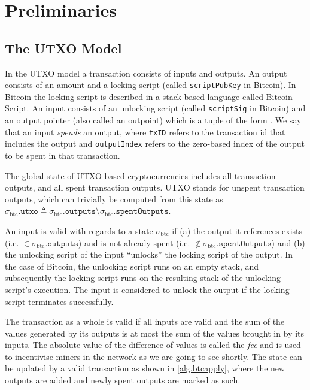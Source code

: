 \section{Preliminaries}
\subsection{The UTXO Model}
In the UTXO model a transaction consists of inputs and outputs. An output consists of an amount and a locking script (called \texttt{scriptPubKey} in Bitcoin). In Bitcoin the locking script is described in a stack-based language called Bitcoin Script. An input consists of an unlocking script (called \texttt{scriptSig} in Bitcoin) and an output pointer (also called an outpoint) which is a tuple of the form . We say that an input \emph{spends} an output, where \texttt{txID} refers to the transaction id that includes the output and \texttt{outputIndex} refers to the zero-based index of the output to be spent in that transaction.

\def\btcstate{\ensuremath{\sigma_\text{btc}}}
\def\btcapply{\text{apply}\textsubscript{btc}}
\def\outputs{\texttt{outputs}}
\def\inputs{\texttt{inputs}}
\def\spentOutputs{\texttt{spentOutputs}}
\def\utxo{\texttt{utxo}}
The global state of UTXO based cryptocurrencies includes all transaction outputs, and all spent transaction outputs. UTXO stands for unspent transaction outputs, which can trivially be computed from this state as $\btcstate.\utxo \triangleq \btcstate.\outputs \setminus \btcstate.\spentOutputs$.

An input is valid with regards to a state $\btcstate$ if (a) the output it references exists (i.e. $\in \btcstate.\outputs$) and is not already spent (i.e. $\notin \btcstate.\spentOutputs$) and (b) the unlocking script of the input ``unlocks'' the locking script of the output. In the case of Bitcoin, the unlocking script runs on an empty stack, and subsequently the locking script runs on the resulting stack of the unlocking script's execution. The input is considered to unlock the output if the locking script terminates successfully.

The transaction as a whole is valid if all inputs are valid and the sum of the values generated by its outputs is at most the sum of the values brought in by its inputs. The absolute value of the difference of values is called the \emph{fee} and is used to incentivise miners in the network as we are going to see shortly. The state can be updated by a valid transaction as shown in \cref{alg.btcapply}, where the new outputs are added and newly spent outputs are marked as such.

